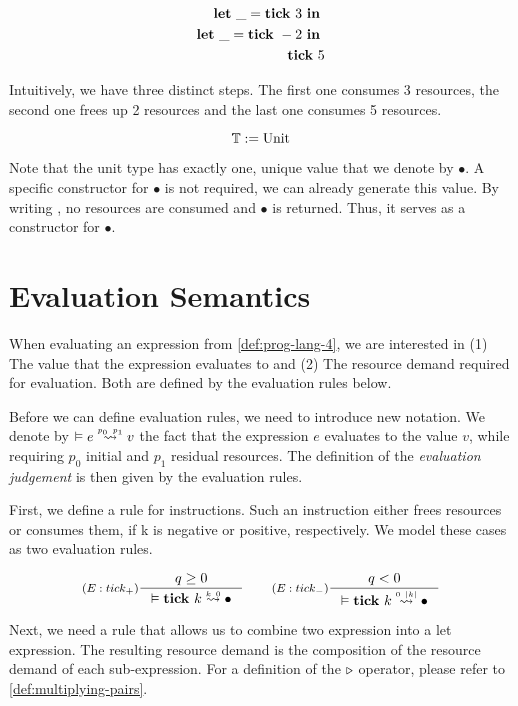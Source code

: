\begin{example} \label{ex:let-tick-prog}
   \begin{align*}
   \mathbf{let}~\_ = \mathbf{tick}~3~\mathbf{in}~ \\
   \mathbf{let}~\_ = \mathbf{tick}~-2~\mathbf{in}~ \\
   \mathbf{tick}~5
   \end{align*}
\end{example}

Intuitively, we have three distinct steps. The first one consumes 3 resources, the second one frees up 2 resources and the last one consumes 5 resources. 

\begin{definition}\label{fig:type-system}
   \[\mathbb{T} := \text{Unit} \]
\end{definition}

Note that the unit type has exactly one, unique value that we denote by \(\bullet\). A specific constructor for \(\bullet\) is not required, we can already generate this value. By writing , no resources are consumed and \(\bullet\) is returned. Thus, it serves as a constructor for \(\bullet\).


\section{Evaluation Semantics}

When evaluating an expression from \cref{def:prog-lang-4}, we are interested in (1) The value that the expression evaluates to and (2) The resource demand required for evaluation. Both are defined by the evaluation rules below. 

Before we can define evaluation rules, we need to introduce new notation. We denote by \(\evals{}{e}{v}{p_0}{p_1}\) the fact that the expression \(e\) evaluates to the value \(v\), while requiring \(p_0\) initial and \(p_1\) residual resources. The definition of the \emph{evaluation judgement} is then given by the evaluation rules.

First, we define a rule for  instructions. Such an instruction either frees resources or consumes them, if k is negative or positive, respectively. We model these cases as two evaluation rules.

\[
   \inference[\((E:tick_{+})\)]
   {q \geq 0}
   {\evals{}{\tick{k}}{\bullet}{k}{0}}
   \qquad
   \inference[\((E:tick_{-})\)]
   {q < 0}
   {\evals{}{\tick{k}}{\bullet}{0}{|k|}}
\]

Next, we need a rule that allows us to combine two expression into a let expression. The resulting resource demand is the composition of the resource demand of each sub-expression. For a definition of the \(\triangleright\) operator, please refer to \cref{def:multiplying-pairs}.

